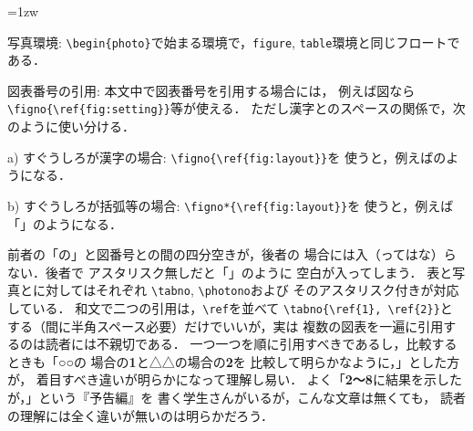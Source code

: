 \documentclass[dvipdfmx,onecolumn]{jsce}  %
\begin{document}
\begin{Description}
\parindent=1zw
%
\item[写真環境:] \verb+\begin{photo}+で始まる環境で，{\tt figure},
 {\tt table}環境と同じフロートである．
%
\item[図表番号の引用:] 本文中で図表番号を引用する場合には，
例えば図なら \verb+\figno{\ref{fig:setting}}+等が使える．
ただし漢字とのスペースの関係で，次のように使い分ける．
\begin{Description}
\item[a) すぐうしろが漢字の場合:] \verb+\figno{\ref{fig:layout}}+を
使うと，例えば\figno{\ref{fig:layout}}のようになる．
\item[b) すぐうしろが括弧等の場合:] \verb+\figno*{\ref{fig:layout}}+を
使うと，例えば「\figno*{\ref{fig:layout}}」のようになる．
\end{Description}
前者の「の」と図番号との間の四分空きが，後者の
場合には入（ってはな）らない．後者で
アスタリスク無しだと「\figno{\ref{fig:layout}}」のように
空白が入ってしまう．
表と写真とに対してはそれぞれ \verb+\tabno+, \verb+\photono+および
そのアスタリスク付きが対応している．
和文で二つの引用は，\verb+\ref+を並べて \verb+\tabno{\ref{1}, \ref{2}}+と
する（間に半角スペース必要）だけでいいが，実は
複数の図表を一遍に引用するのは読者には不親切である．
一つ一つを順に引用すべきであるし，比較するときも「○○の
場合の{\bf \figurename1}と△△の場合の{\bf \figurename2}を
比較して明らかなように，」とした方が，
着目すべき違いが明らかになって理解し易い．
よく「{\bf \figurename 2〜8}に結果を示したが，」という『予告編』を
書く学生さんがいるが，こんな文章は無くても，
読者の理解には全く違いが無いのは明らかだろう．


\end{Description}
\end{document}
